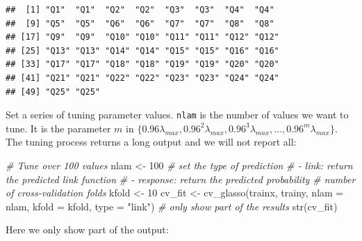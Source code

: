 \documentclass[
  12pt,
]{krantz}
\makeatletter
\newenvironment{Shaded}{\begin{snugshade}}{\end{snugshade}}
\newcommand{\AttributeTok}[1]{\textcolor[rgb]{0.61,0.61,0.61}{#1}}
\newcommand{\CommentTok}[1]{\textcolor[rgb]{0.37,0.37,0.37}{\textit{#1}}}
\newcommand{\DecValTok}[1]{\textcolor[rgb]{0.06,0.06,0.06}{#1}}
\newcommand{\FunctionTok}[1]{\textcolor[rgb]{0,0,0}{#1}}
\newcommand{\NormalTok}[1]{#1}
\newcommand{\OtherTok}[1]{\textcolor[rgb]{0.37,0.37,0.37}{#1}}
\newcommand{\StringTok}[1]{\textcolor[rgb]{0.5,0.5,0.5}{#1}}
\newenvironment{kframe}{%
\medskip{}
\setlength{\fboxsep}{.8em}
 \def\at@end@of@kframe{}%
 \ifinner\ifhmode%
  \def\at@end@of@kframe{\end{minipage}}%
  \begin{minipage}{\columnwidth}%
 \fi\fi%
 \def\FrameCommand##1{\hskip\@totalleftmargin \hskip-\fboxsep
 \colorbox{shadecolor}{##1}\hskip-\fboxsep
     \hskip-\linewidth \hskip-\@totalleftmargin \hskip\columnwidth}%
 \MakeFramed {\advance\hsize-\width
   \@totalleftmargin\z@ \linewidth\hsize
   \@setminipage}}%
 {\par\unskip\endMakeFramed%
 \at@end@of@kframe}
\renewenvironment{Shaded}{\begin{kframe}}{\end{kframe}}
\makeatother
\begin{document}
\begin{verbatim}
##  [1] "Q1"  "Q1"  "Q2"  "Q2"  "Q3"  "Q3"  "Q4"  "Q4" 
##  [9] "Q5"  "Q5"  "Q6"  "Q6"  "Q7"  "Q7"  "Q8"  "Q8" 
## [17] "Q9"  "Q9"  "Q10" "Q10" "Q11" "Q11" "Q12" "Q12"
## [25] "Q13" "Q13" "Q14" "Q14" "Q15" "Q15" "Q16" "Q16"
## [33] "Q17" "Q17" "Q18" "Q18" "Q19" "Q19" "Q20" "Q20"
## [41] "Q21" "Q21" "Q22" "Q22" "Q23" "Q23" "Q24" "Q24"
## [49] "Q25" "Q25"
\end{verbatim}

Set a series of tuning parameter values. \texttt{nlam} is the number of values we want to tune. It is the parameter \(m\) in \(\{0.96\lambda_{max},0.96^{2}\lambda_{max},0.96^{3}\lambda_{max},...,0.96^{m}\lambda_{max}\}\). The tuning process returns a long output and we will not report all:

\begin{Shaded}
\begin{Highlighting}[]
\CommentTok{\# Tune over 100 values}
\NormalTok{nlam }\OtherTok{\textless{}{-}} \DecValTok{100}
\CommentTok{\# set the type of prediction}
\CommentTok{\# {-} \textasciigrave{}link\textasciigrave{}: return the predicted link function}
\CommentTok{\# {-} \textasciigrave{}response\textasciigrave{}: return the predicted probability}
\CommentTok{\# number of cross{-}validation folds}
\NormalTok{kfold }\OtherTok{\textless{}{-}} \DecValTok{10}
\NormalTok{cv\_fit }\OtherTok{\textless{}{-}} \FunctionTok{cv\_glasso}\NormalTok{(trainx, trainy, }
                    \AttributeTok{nlam =}\NormalTok{ nlam, }\AttributeTok{kfold =}\NormalTok{ kfold, }\AttributeTok{type =} \StringTok{"link"}\NormalTok{)}
\CommentTok{\# only show part of the results}
\FunctionTok{str}\NormalTok{(cv\_fit)}
\end{Highlighting}
\end{Shaded}

Here we only show part of the output:

\begin{Shaded}
\end{Shaded}
\end{document}

